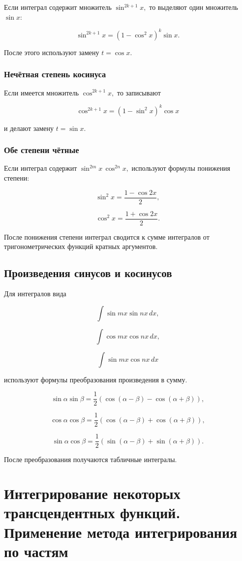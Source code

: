 \documentclass[14pt]{extreport}
\begin{document}
Если интеграл содержит множитель $\sin^{2k+1}x,$
то выделяют один множитель $\sin x$:

\[
\sin^{2k+1}x=
(1-\cos^2x)^k\sin x.
\]

После этого используют замену $t=\cos x.$

\subsection{Нечётная степень косинуса}

Если имеется множитель $\cos^{2k+1}x,$
то записывают

\[
\cos^{2k+1}x=
(1-\sin^2x)^k\cos x
\]

и делают замену $t=\sin x.$

\subsection{Обе степени чётные}

Если интеграл содержит $\sin^{2m}x\,\cos^{2n}x,$
используют формулы понижения степени:

\[
\sin^2x=\frac{1-\cos2x}{2},
\]

\[
\cos^2x=\frac{1+\cos2x}{2}.
\]

После понижения степени интеграл сводится к сумме
интегралов от тригонометрических функций кратных аргументов.

\section{Произведения синусов и косинусов}

Для интегралов вида

\[
\int \sin mx\sin nx\,dx,
\]

\[
\int \cos mx\cos nx\,dx,
\]

\[
\int \sin mx\cos nx\,dx
\]

используют формулы преобразования произведения в сумму.

\[
\sin\alpha\sin\beta
=
\frac12
\left(
\cos(\alpha-\beta)
-
\cos(\alpha+\beta)
\right),
\]

\[
\cos\alpha\cos\beta
=
\frac12
\left(
\cos(\alpha-\beta)
+
\cos(\alpha+\beta)
\right),
\]

\[
\sin\alpha\cos\beta
=
\frac12
\left(
\sin(\alpha-\beta)
+
\sin(\alpha+\beta)
\right).
\]

После преобразования получаются табличные интегралы.

\chapter{Интегрирование некоторых трансцендентных функций.
Применение метода интегрирования по частям}
\end{document}
